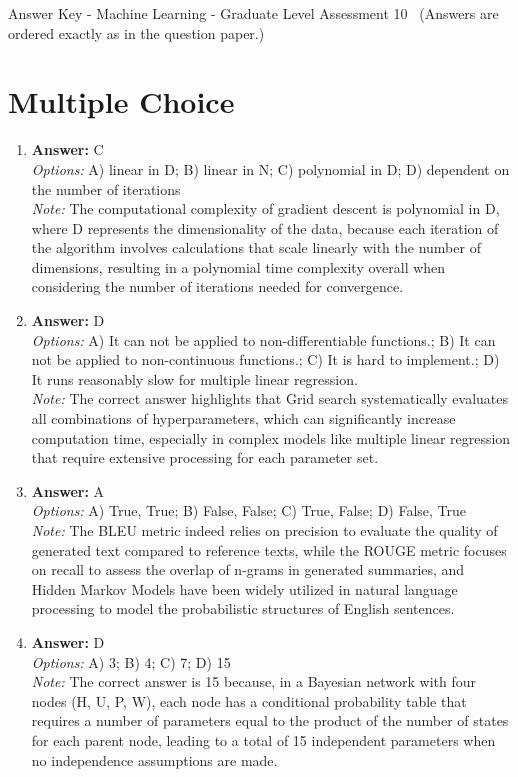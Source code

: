 \documentclass[12pt]{article}
\begin{document}
\begin{center}
Answer Key - Machine Learning - Graduate Level Assessment 10 \
\small (Answers are ordered exactly as in the question paper.)
\end{center}

\section*{Multiple Choice}
\begin{enumerate}[label=\arabic*.]
\item \textbf{Answer:} C
\\ \textit{Options:} A) linear in D; B) linear in N; C) polynomial in D; D) dependent on the number of iterations
\\ \textit{Note:} The computational complexity of gradient descent is polynomial in D, where D represents the dimensionality of the data, because each iteration of the algorithm involves calculations that scale linearly with the number of dimensions, resulting in a polynomial time complexity overall when considering the number of iterations needed for convergence.
\item \textbf{Answer:} D
\\ \textit{Options:} A) It can not be applied to non-differentiable functions.; B) It can not be applied to non-continuous functions.; C) It is hard to implement.; D) It runs reasonably slow for multiple linear regression.
\\ \textit{Note:} The correct answer highlights that Grid search systematically evaluates all combinations of hyperparameters, which can significantly increase computation time, especially in complex models like multiple linear regression that require extensive processing for each parameter set.
\item \textbf{Answer:} A
\\ \textit{Options:} A) True, True; B) False, False; C) True, False; D) False, True
\\ \textit{Note:} The BLEU metric indeed relies on precision to evaluate the quality of generated text compared to reference texts, while the ROUGE metric focuses on recall to assess the overlap of n-grams in generated summaries, and Hidden Markov Models have been widely utilized in natural language processing to model the probabilistic structures of English sentences.
\item \textbf{Answer:} D
\\ \textit{Options:} A) 3; B) 4; C) 7; D) 15
\\ \textit{Note:} The correct answer is 15 because, in a Bayesian network with four nodes (H, U, P, W), each node has a conditional probability table that requires a number of parameters equal to the product of the number of states for each parent node, leading to a total of 15 independent parameters when no independence assumptions are made.

\end{enumerate}
\end{document}
